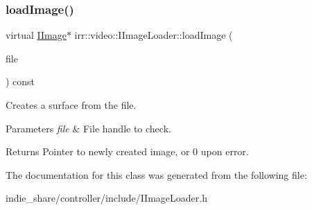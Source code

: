 \subsubsection{\texorpdfstring{load\+Image()}{loadImage()}\hspace{0.1cm}{\footnotesize\ttfamily [2/2]}}
{\footnotesize\ttfamily virtual \hyperlink{classirr_1_1video_1_1IImage}{I\+Image}$\ast$ irr\+::video\+::\+I\+Image\+Loader\+::load\+Image (\begin{DoxyParamCaption}\item[{\hyperlink{classirr_1_1io_1_1IReadFile}{io\+::\+I\+Read\+File} $\ast$}]{file }\end{DoxyParamCaption}) const\hspace{0.3cm}{\ttfamily [pure virtual]}}



Creates a surface from the file. 


\begin{DoxyParams}{Parameters}
{\em file} & File handle to check. \\
\hline
\end{DoxyParams}
\begin{DoxyReturn}{Returns}
Pointer to newly created image, or 0 upon error. 
\end{DoxyReturn}


The documentation for this class was generated from the following file\+:\begin{DoxyCompactItemize}
\item 
indie\+\_\+share/controller/include/I\+Image\+Loader.\+h\end{DoxyCompactItemize}
